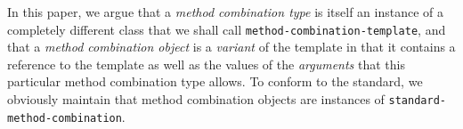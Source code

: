In this paper, we argue that a \emph{method combination type} is
itself an instance of a completely different class that we shall call
\texttt{method-combination-template}, and that a \emph{method
  combination object} is a \emph{variant} of the template in that it
contains a reference to the template as well as the values of the
\emph{arguments} that this particular method combination type allows.
To conform to the standard, we obviously maintain that method
combination objects are instances of
\texttt{standard-method-combination}.
